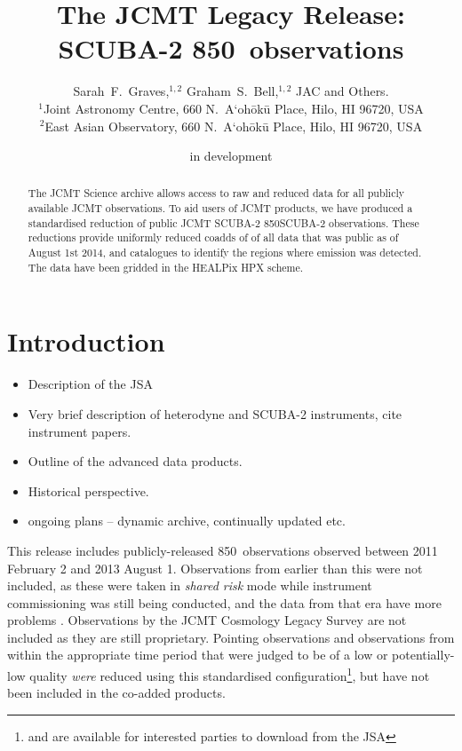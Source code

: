 \documentclass[usenatbib]{mn2e}
\title[SCUBA-2 850\um\ Legacy Release]%
{The JCMT Legacy Release: SCUBA-2 850\bmicron\ observations}
\author[S.~F.~Graves et~al.]
{Sarah~F.~Graves,$^{1,2}$
Graham~S.~Bell,$^{1,2}$
JAC
and
Others.\\
$^1$Joint Astronomy Centre, 660 N.\ A`oh\=ok\=u Place, Hilo, HI 96720, USA\\
$^2$East Asian Observatory, 660 N.\ A`oh\=ok\=u Place, Hilo, HI 96720, USA
}
\newcommand{\um}{\micron}
\begin{document}
\date{in development}

\pagerange{\pageref{firstpage}--\pageref{lastpage}} 

\maketitle

\label{firstpage}

\begin{abstract}
  The JCMT Science archive allows access to raw and reduced data for
  all publicly available JCMT observations. To aid users of JCMT
  products, we have produced a standardised reduction of public JCMT
  SCUBA-2 850\micron SCUBA-2 observations. These reductions provide
  uniformly reduced coadds of of all data that was public as of August
  1st 2014, and catalogues to identify the regions where emission was
  detected. The data have been gridded in the HEALPix HPX scheme.
\end{abstract}

\section{Introduction}
\begin{itemize}
\item Description of the JSA \citep{2015Economou}
\item Very brief description of heterodyne and SCUBA-2 instruments, cite instrument papers. \citep{2013MNRAS.430.2513H} \citep{2009MNRAS.399.1026B}
\item Outline of the advanced data products. \citep{2014SPIE.9152E..2JB}
\item Historical perspective. \citep{2011ASPC..442..203E}
\item ongoing plans -- dynamic archive, continually updated etc.
\end{itemize}

This release includes publicly-released 850\um\ observations observed
between 2011 February 2 and
2013 August 1. Observations from earlier than this were not included, as
these were taken in \emph{shared risk} mode while instrument
commissioning was still being conducted, and the data from that era
have more problems \citep{SC19,2010SPIE.7741E..1XD}.  Observations by the JCMT Cosmology Legacy Survey
\citep{2013MNRAS.432...53G} are not included as they are still
proprietary. Pointing observations and observations from within the
appropriate time period that were judged to be of a low or
potentially-low quality \emph{were} reduced using this standardised
configuration\footnote{and are available for interested parties to
  download from the JSA}, but have not been included in the co-added
products.
\end{document}

